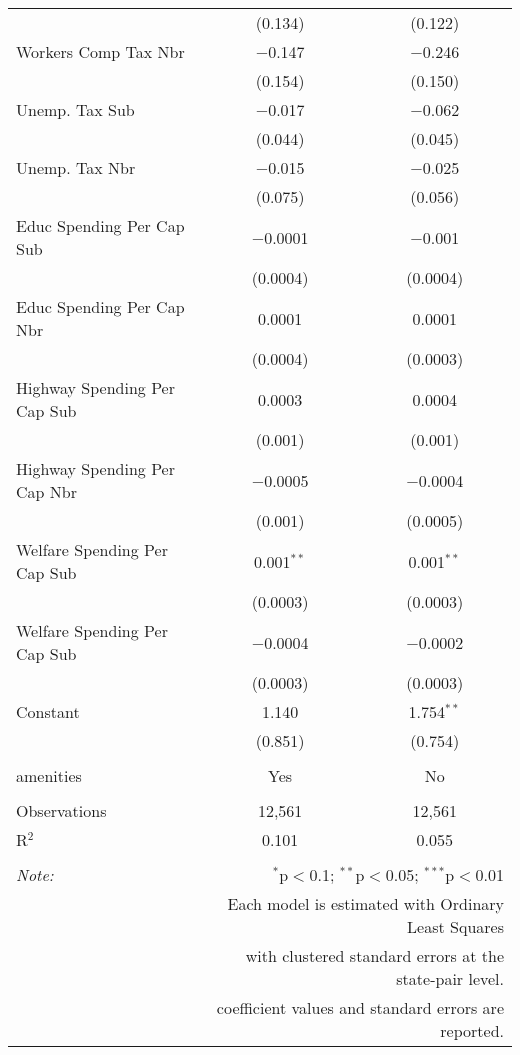 \begin{table}[!htbp]
\begin{tabular}{@{\extracolsep{5pt}}lcc}
  & (0.134) & (0.122) \\ 
  Workers Comp Tax Nbr & $-$0.147 & $-$0.246 \\ 
  & (0.154) & (0.150) \\ 
  Unemp. Tax Sub & $-$0.017 & $-$0.062 \\ 
  & (0.044) & (0.045) \\ 
  Unemp. Tax Nbr & $-$0.015 & $-$0.025 \\ 
  & (0.075) & (0.056) \\ 
  Educ Spending Per Cap Sub & $-$0.0001 & $-$0.001 \\ 
  & (0.0004) & (0.0004) \\ 
  Educ Spending Per Cap Nbr & 0.0001 & 0.0001 \\ 
  & (0.0004) & (0.0003) \\ 
  Highway Spending Per Cap Sub & 0.0003 & 0.0004 \\ 
  & (0.001) & (0.001) \\ 
  Highway Spending Per Cap Nbr & $-$0.0005 & $-$0.0004 \\ 
  & (0.001) & (0.0005) \\ 
  Welfare Spending Per Cap Sub & 0.001$^{**}$ & 0.001$^{**}$ \\ 
  & (0.0003) & (0.0003) \\ 
  Welfare Spending Per Cap Sub & $-$0.0004 & $-$0.0002 \\ 
  & (0.0003) & (0.0003) \\ 
  Constant & 1.140 & 1.754$^{**}$ \\ 
  & (0.851) & (0.754) \\ 
 \hline \\[-1.8ex] 
amenities & Yes & No \\ 
\hline \\[-1.8ex] 
Observations & 12,561 & 12,561 \\ 
R$^{2}$ & 0.101 & 0.055 \\ 
\hline 
\hline \\[-1.8ex] 
\textit{Note:}  & \multicolumn{2}{r}{$^{*}$p$<$0.1; $^{**}$p$<$0.05; $^{***}$p$<$0.01} \\ 
 & \multicolumn{2}{r}{Each model is estimated with Ordinary Least Squares} \\ 
 & \multicolumn{2}{r}{with clustered standard errors at the state-pair level.} \\ 
 & \multicolumn{2}{r}{coefficient values and standard errors are reported.} \\ 
\end{tabular} 
\end{table} 
